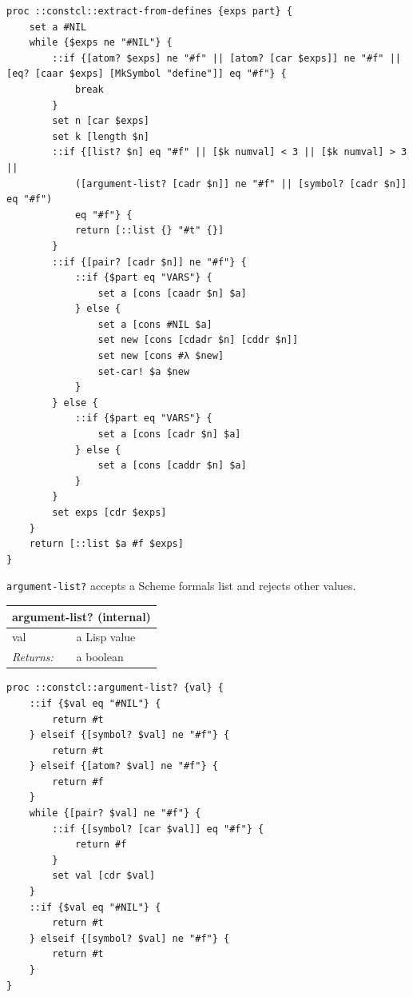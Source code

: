 \documentclass[twoside,9pt]{report}
\begin{document}
\noindent\makebox[\linewidth]{\rule{\linewidth}{0.4pt}}
\begin{lstlisting}
proc ::constcl::extract-from-defines {exps part} {
    set a #NIL
    while {$exps ne "#NIL"} {
        ::if {[atom? $exps] ne "#f" || [atom? [car $exps]] ne "#f" || [eq? [caar $exps] [MkSymbol "define"]] eq "#f"} {
            break
        }
        set n [car $exps]
        set k [length $n]
        ::if {[list? $n] eq "#f" || [$k numval] < 3 || [$k numval] > 3 ||
            ([argument-list? [cadr $n]] ne "#f" || [symbol? [cadr $n]] eq "#f")
            eq "#f"} {
            return [::list {} "#t" {}]
        }
        ::if {[pair? [cadr $n]] ne "#f"} {
            ::if {$part eq "VARS"} {
                set a [cons [caadr $n] $a]
            } else {
                set a [cons #NIL $a]
                set new [cons [cdadr $n] [cddr $n]]
                set new [cons #λ $new]
                set-car! $a $new
            }
        } else {
            ::if {$part eq "VARS"} {
                set a [cons [cadr $n] $a]
            } else {
                set a [cons [caddr $n] $a]
            }
        }
        set exps [cdr $exps]
    }
    return [::list $a #f $exps]
}
\end{lstlisting}
\noindent\makebox[\linewidth]{\rule{\linewidth}{0.4pt}}

\texttt{argument-list?} accepts a Scheme formals list and rejects other values.

\begin{tabular}{ |l l| }
\hline
\multicolumn{2}{|l|}{argument-list? (internal)} \\
\hline
val & a Lisp value \\
\textit{Returns:} & a boolean \\
\hline
\end{tabular}

\noindent\makebox[\linewidth]{\rule{\linewidth}{0.4pt}}
\begin{lstlisting}
proc ::constcl::argument-list? {val} {
    ::if {$val eq "#NIL"} {
        return #t
    } elseif {[symbol? $val] ne "#f"} {
        return #t
    } elseif {[atom? $val] ne "#f"} {
        return #f
    }
    while {[pair? $val] ne "#f"} {
        ::if {[symbol? [car $val]] eq "#f"} {
            return #f
        }
        set val [cdr $val]
    }
    ::if {$val eq "#NIL"} {
        return #t
    } elseif {[symbol? $val] ne "#f"} {
        return #t
    }
}
\end{lstlisting}
\noindent\makebox[\linewidth]{\rule{\linewidth}{0.4pt}}
\end{document}
